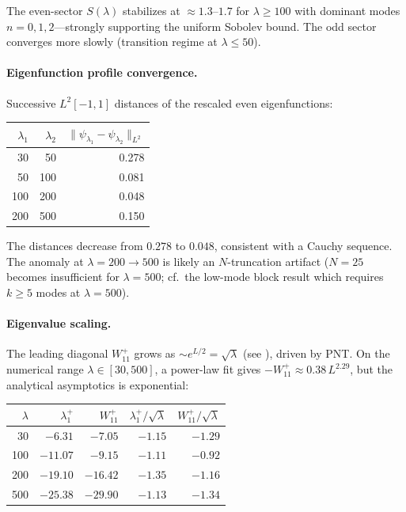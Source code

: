 \documentclass[12pt,a4paper]{article}
\theoremstyle{definition}
\theoremstyle{remark}
\begin{document}
\noindent The even-sector $S(\lambda)$ stabilizes at $\approx 1.3$--$1.7$ for $\lambda \geq 100$ with dominant modes $n = 0, 1, 2$---strongly supporting the uniform Sobolev bound. The odd sector converges more slowly (transition regime at $\lambda \leq 50$).

\paragraph{Eigenfunction profile convergence.}
Successive $L^2[-1,1]$ distances of the rescaled even eigenfunctions:

\begin{center}
\begin{tabular}{r@{${}\to{}$}r|r}
$\lambda_1$ & $\lambda_2$ & $\|\psi_{\lambda_1} - \psi_{\lambda_2}\|_{L^2}$ \\\hline
30  & 50  & 0.278 \\
50  & 100 & 0.081 \\
100 & 200 & 0.048 \\
200 & 500 & 0.150
\end{tabular}
\end{center}

\noindent The distances decrease from $0.278$ to $0.048$, consistent with a Cauchy sequence. The anomaly at $\lambda = 200 \to 500$ is likely an $N$-truncation artifact ($N = 25$ becomes insufficient for $\lambda = 500$; cf.\ the low-mode block result which requires $k \geq 5$ modes at $\lambda = 500$).

\paragraph{Eigenvalue scaling.}
The leading diagonal $W_{11}^+$ grows as $\sim e^{L/2} = \sqrt{\lambda}$ (see ), driven by PNT. On the numerical range $\lambda \in [30, 500]$, a power-law fit gives $-W_{11}^+ \approx 0.38\,L^{2.29}$, but the analytical asymptotics is exponential:

\begin{center}
\begin{tabular}{r|r|r|r|r}
$\lambda$ & $\lambda_1^+$ & $W_{11}^+$ & $\lambda_1^+ / \sqrt{\lambda}$ & $W_{11}^+ / \sqrt{\lambda}$ \\\hline
30  & $-6.31$  & $-7.05$  & $-1.15$ & $-1.29$ \\
100 & $-11.07$ & $-9.15$  & $-1.11$ & $-0.92$ \\
200 & $-19.10$ & $-16.42$ & $-1.35$ & $-1.16$ \\
500 & $-25.38$ & $-29.90$ & $-1.13$ & $-1.34$
\end{tabular}
\end{center}
\end{document}

